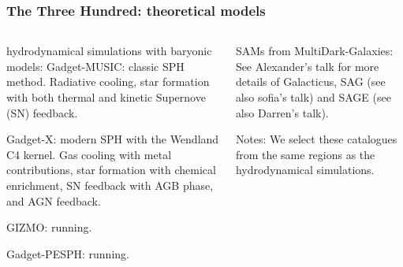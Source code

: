 \documentclass[aspectratio=1610]{beamer}
\begin{document}
\begin{frame}
  \frametitle{The Three Hundred: theoretical models}
  \begin{columns}[t]
    \begin{column}{0.55\textwidth}
      \begin{block}{hydrodynamical simulations with baryonic models:}
        {\sc Gadget-\alert{MUSIC}}: classic SPH method. Radiative cooling, star formation with both thermal and kinetic Supernove (SN) feedback.

        {\sc Gadget-\alert{X}}: modern SPH with the Wendland C4 kernel. Gas cooling with metal contributions, star formation with chemical enrichment, SN feedback with AGB phase, and AGN feedback.

        {\sc GIZMO:} running.

        {\sc Gadget-PESPH:} running.
      \end{block}
    \end{column}
    \begin{column}{0.4\textwidth}
      \begin{block}{SAMs from MultiDark-Galaxies:}
        See Alexander's talk for more details of {\sc Galacticus}, {\sc SAG} (see also sofia's talk) and {\sc SAGE} (see also Darren's talk).

        Notes: We select these catalogues from the same regions as the hydrodynamical simulations.
      \end{block}
    \end{column}
  \end{columns}
\end{frame}
\end{document}
